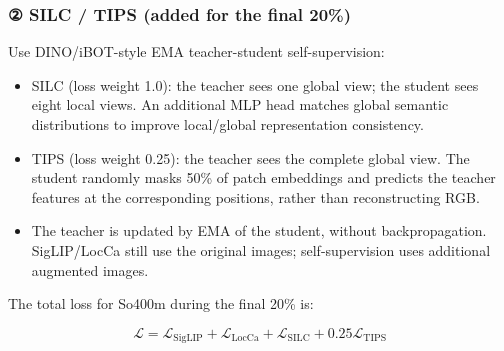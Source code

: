 \subsubsection{{②} SILC /\allowbreak{} TIPS (added for the final 20\%)}
Use DINO/\allowbreak{}iBOT-\allowbreak{}style EMA teacher-\allowbreak{}student self-\allowbreak{}supervision:\par
\begin{itemize}
\item SILC (loss weight 1.\allowbreak{}0): the teacher sees one global view; the student sees eight local views.\allowbreak{} An additional MLP head matches global semantic distributions to improve local/\allowbreak{}global representation consistency.\allowbreak{}
\item TIPS (loss weight 0.\allowbreak{}25): the teacher sees the complete global view.\allowbreak{} The student randomly masks 50\% of patch embeddings and predicts the teacher features at the corresponding positions, rather than reconstructing RGB.\allowbreak{}
\item The teacher is updated by EMA of the student, without backpropagation.\allowbreak{} SigLIP/\allowbreak{}LocCa still use the original images; self-\allowbreak{}supervision uses additional augmented images.\allowbreak{}
\end{itemize}
The total loss for So400m during the final 20\% is:\par
\[
\mathcal{L}=\mathcal{L}_{\mathrm{SigLIP}}+\mathcal{L}_{\mathrm{LocCa}}+\mathcal{L}_{\mathrm{SILC}}+0.25\mathcal{L}_{\mathrm{TIPS}}
\]
